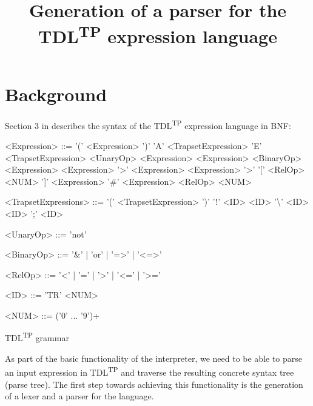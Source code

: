 \documentclass[12pt,oneside,a4paper,notitlepage]{report}
\title{
	Generation of a parser for the TDL\textsuperscript{TP} expression language
}
\newcommand{\texttilde}{\raisebox{0.5ex}{\texttildelow}}
\begin{document}
	\maketitle

	\section*{Background}
	\par Section 3 in \cite{tdlarticle} describes the syntax of the TDL\textsuperscript{TP} expression language in BNF:

	\begin{GrammarWrapper}
		\begin{grammar}
		<Expression>	::=	'(' <Expression> ')'
		\alt 				'A' <TrapsetExpression>
		\alt 				'E' <TrapsetExpression>
		\alt 				<UnaryOp> <Expression>
		\alt 				<Expression> <BinaryOp> <Expression>
		\alt 				<Expression> '\texttilde\textgreater' <Expression>
		\alt 				<Expression> '\texttilde\textgreater' '[' <RelOp> <NUM> ']' <Expression>
		\alt 				'\#' <Expression> <RelOp> <NUM>
		
		<TrapsetExpressions>	::=	'(' <TrapsetExpression> ')'
		\alt						'!' <ID>
		\alt 						<ID> '\textbackslash' <ID>
		\alt						<ID> ';' <ID>
		
		<UnaryOp>	::= 'not'
		
		<BinaryOp>	::= '\&' | 'or' | '=\textgreater' | '\textless=\textgreater'
		
		<RelOp> 	::= '\textless' | '=' | '\textgreater' | '\textless=' | '\textgreater='
		
		<ID> 		::= 'TR' <NUM>
		
		<NUM> 		::= ('0' ... '9')+
		\end{grammar}
		\caption{TDL\textsuperscript{TP} grammar}\label{bnf:original}
	\end{GrammarWrapper}

	As part of the basic functionality of the interpreter, we need to be able to parse an input expression in TDL\textsuperscript{TP} and traverse the resulting concrete syntax tree (parse tree). The first step towards achieving this functionality is the generation of a lexer and a parser for the language. 
\end{document}
